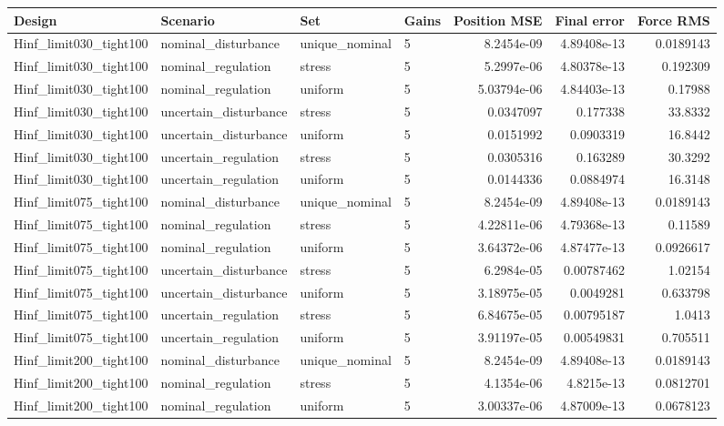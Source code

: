 \begin{tabular}{llllrrr}
\hline
Design & Scenario & Set & Gains & Position MSE & Final error & Force RMS \\
\hline
Hinf\_limit030\_tight100 & nominal\_disturbance & unique\_nominal & 5 & 8.2454e-09 & 4.89408e-13 & 0.0189143 \\
Hinf\_limit030\_tight100 & nominal\_regulation & stress & 5 & 5.2997e-06 & 4.80378e-13 & 0.192309 \\
Hinf\_limit030\_tight100 & nominal\_regulation & uniform & 5 & 5.03794e-06 & 4.84403e-13 & 0.17988 \\
Hinf\_limit030\_tight100 & uncertain\_disturbance & stress & 5 & 0.0347097 & 0.177338 & 33.8332 \\
Hinf\_limit030\_tight100 & uncertain\_disturbance & uniform & 5 & 0.0151992 & 0.0903319 & 16.8442 \\
Hinf\_limit030\_tight100 & uncertain\_regulation & stress & 5 & 0.0305316 & 0.163289 & 30.3292 \\
Hinf\_limit030\_tight100 & uncertain\_regulation & uniform & 5 & 0.0144336 & 0.0884974 & 16.3148 \\
Hinf\_limit075\_tight100 & nominal\_disturbance & unique\_nominal & 5 & 8.2454e-09 & 4.89408e-13 & 0.0189143 \\
Hinf\_limit075\_tight100 & nominal\_regulation & stress & 5 & 4.22811e-06 & 4.79368e-13 & 0.11589 \\
Hinf\_limit075\_tight100 & nominal\_regulation & uniform & 5 & 3.64372e-06 & 4.87477e-13 & 0.0926617 \\
Hinf\_limit075\_tight100 & uncertain\_disturbance & stress & 5 & 6.2984e-05 & 0.00787462 & 1.02154 \\
Hinf\_limit075\_tight100 & uncertain\_disturbance & uniform & 5 & 3.18975e-05 & 0.0049281 & 0.633798 \\
Hinf\_limit075\_tight100 & uncertain\_regulation & stress & 5 & 6.84675e-05 & 0.00795187 & 1.0413 \\
Hinf\_limit075\_tight100 & uncertain\_regulation & uniform & 5 & 3.91197e-05 & 0.00549831 & 0.705511 \\
Hinf\_limit200\_tight100 & nominal\_disturbance & unique\_nominal & 5 & 8.2454e-09 & 4.89408e-13 & 0.0189143 \\
Hinf\_limit200\_tight100 & nominal\_regulation & stress & 5 & 4.1354e-06 & 4.8215e-13 & 0.0812701 \\
Hinf\_limit200\_tight100 & nominal\_regulation & uniform & 5 & 3.00337e-06 & 4.87009e-13 & 0.0678123 \\

\end{tabular}
